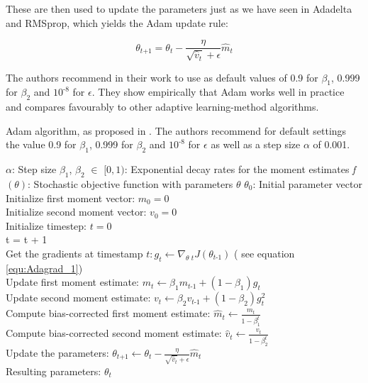 \documentclass[12pt,oneside,a4paper,parskip]{scrbook}
\begin{document}
These are then used to update the parameters just as we have seen in Adadelta and RMSprop, which yields the Adam update rule:

\begin{equation}
\theta_\textit{t+1} = \theta_\textit{t}-\frac{\eta}{\sqrt{\hat{v}_t} + \epsilon} \hat{m}_t
\label{equ:adam_3}
\end{equation}

The authors recommend in their work to use as default values of 0.9 for $\beta_1$, 0.999 for $\beta_2$ and $10^\textit{-8}$ for $\epsilon$.
They show empirically that Adam works well in practice and compares favourably to other adaptive learning-method algorithms.
\cite{overvieDiffRSLVQ, Kingma2014AdamAM}

\begin{algorithm}
  \caption{Adam algorithm, as proposed in \cite{Kingma2014AdamAM}. The authors recommend for default settings the value
          0.9 for $\beta_1$, 0.999 for $\beta_2$ and $10^\textit{-8}$ for $\epsilon$ as well as a step size $\alpha$ of 0.001.}\label{euclid}
  \begin{algorithmic}[1]
    \Require $\alpha$: Step size
    \Require $\beta_1$, $\beta_2$ $\in$ $[0,1)$: Exponential decay rates for the moment estimates
    \Require \textit{f}$(\theta)$: Stochastic objective function with parameters $\theta$
    \Require $\theta_0$: Initial parameter vector \\
    Initialize first moment vector: $m_0 = 0$ \\
    Initialize second moment vector: $v_0 = 0$ \\
    Initialize timestep: $t = 0$ 
     \\
      t = t + 1 \\
      Get the gradients at timestamp $\textit{t}: \textit{g}_t \leftarrow \nabla_\textit{$\theta$ t}\textit{J}(\theta_\textit{t-1})$ ( see equation \ref{equ:Adagrad_1}) \\
      Update first moment estimate: $\textit{m}_t \leftarrow \beta_1\textit{m}_\textit{t-1} + (1-\beta_1)\textit{g}_t$ \\
      Update second moment estimate: $\textit{v}_t \leftarrow \beta_2\textit{v}_\textit{t-1} + (1-\beta_2)\textit{g}^2_t$ \\
      Compute bias-corrected first moment estimate: $\hat{m}_t \leftarrow \frac{\textit{m}_t}{1-\beta^t_1}$ \\
      Compute bias-corrected second moment estimate: $\hat{v}_t \leftarrow \frac{\textit{v}_t}{1-\beta^t_2}$ \\
      Update the parameters: $\theta_\textit{t+1} \leftarrow \theta_\textit{t}-\frac{\eta}{\sqrt{\hat{v}_t}+ \epsilon} \hat{m}_t$ \\
    \EndWhile
    \Return Resulting parameters: $\theta_t$
  \end{algorithmic}
\end{algorithm}
\end{document}
